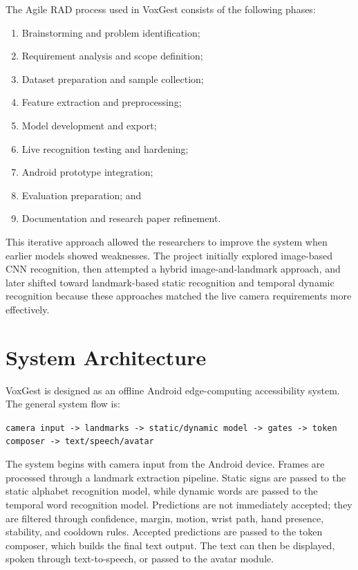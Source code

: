 The Agile RAD process used in VoxGest consists of the following phases:

\begin{enumerate}
    \item Brainstorming and problem identification;
    \item Requirement analysis and scope definition;
    \item Dataset preparation and sample collection;
    \item Feature extraction and preprocessing;
    \item Model development and export;
    \item Live recognition testing and hardening;
    \item Android prototype integration;
    \item Evaluation preparation; and
    \item Documentation and research paper refinement.
\end{enumerate}

This iterative approach allowed the researchers to improve the system when earlier models showed weaknesses. The project initially explored image-based CNN recognition, then attempted a hybrid image-and-landmark approach, and later shifted toward landmark-based static recognition and temporal dynamic recognition because these approaches matched the live camera requirements more effectively.

\section{System Architecture}

VoxGest is designed as an offline Android edge-computing accessibility system. The general system flow is:

\begin{center}
\texttt{camera input -> landmarks -> static/dynamic model -> gates -> token composer -> text/speech/avatar}
\end{center}

The system begins with camera input from the Android device. Frames are processed through a landmark extraction pipeline. Static signs are passed to the static alphabet recognition model, while dynamic words are passed to the temporal word recognition model. Predictions are not immediately accepted; they are filtered through confidence, margin, motion, wrist path, hand presence, stability, and cooldown rules. Accepted predictions are passed to the token composer, which builds the final text output. The text can then be displayed, spoken through text-to-speech, or passed to the avatar module.

